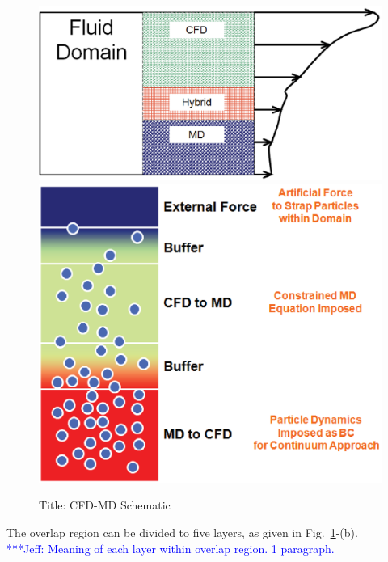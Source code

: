 \documentclass[conference,final]{IEEEtran}
\newcommand{\skonote}[1]{ {\textcolor{blue} { ***Jeff: #1 }}}
\newcommand{\skonote}[1]{}
\begin{document}
\begin{figure}
\centering
\includegraphics[scale=0.3]{CFD-MD_Schematic_a.eps}
\linebreak
\includegraphics[scale=0.3]{CFD-MD_Schematic_b.eps}
\caption{\small Title: CFD-MD Schematic}
\label{Fig:CFD-MD_Schematic}
\vspace{-1em}
\end{figure}


The overlap region can be divided to five layers, as given in Fig.~\ref{Fig:CFD-MD_Schematic}-(b).\\
\skonote{Meaning of each layer within overlap region. 1 paragraph.}
\newline
\newline
\end{document}
